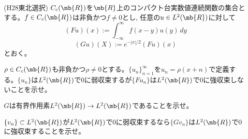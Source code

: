 \begin{prob} (H28東北選択) \label{prob:H28_tohoku_sentaku_6}
$C_{c}(\mb{R})$を$\mb{R}$上のコンパクト台実数値連続関数の集合とする。$f\in C_{c}(\mb{R})$は非負かつ$f\neq 0$とし, 任意の$u\in L^2(\mb{R})$に対して
\[(Fu)(x) :=  \int_{-\infty}^{\infty} f(x-y)u(y)\, dy\]
\[(Gu)(X) := e^{-|x|/2}(Fu)(x)\]
とおく。
\ben
\item $\rho\in C_{c}(\mb{R})$も非負かつ$\rho\neq 0$とする。$\{ u_n \}_{n=1}^{\infty}$を$u_n = \rho(x+n)$で定義する。$\{ u_n \}$は$L^2(\mb{R})$で$0$に弱収束するが$\{ Fu_n \}$は$L^2(\mb{R})$で0に強収束しないことを示せ。
\item $G$は有界作用素$L^2(\mb{R}) \to L^2(\mb{R})$であることを示せ。
\item $\{ v_n \}\subset L^2(\mb{R})$が$L^2(\mb{R})$で$0$に弱収束するなら$\{ Gv_n \}$は$L^2(\mb{R})$で$0$に強収束することを示せ。
\een
\end{prob}










